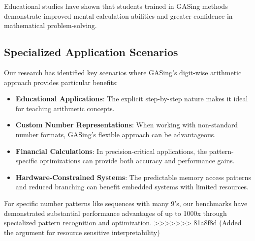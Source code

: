 Educational studies have shown that students trained in GASing methods demonstrate improved mental calculation abilities and greater confidence in mathematical problem-solving.

\subsection{Specialized Application Scenarios}

Our research has identified key scenarios where GASing's digit-wise arithmetic approach provides particular benefits:

\begin{itemize}
    \item \textbf{Educational Applications}: The explicit step-by-step nature makes it ideal for teaching arithmetic concepts.
    \item \textbf{Custom Number Representations}: When working with non-standard number formats, GASing's flexible approach can be advantageous.
    \item \textbf{Financial Calculations}: In precision-critical applications, the pattern-specific optimizations can provide both accuracy and performance gains.
    \item \textbf{Hardware-Constrained Systems}: The predictable memory access patterns and reduced branching can benefit embedded systems with limited resources.
\end{itemize}

For specific number patterns like sequences with many 9's, our benchmarks have demonstrated substantial performance advantages of up to 1000x through specialized pattern recognition and optimization.
>>>>>>> 81a8f8d (Added the argument for resource sensitive interpretability)
